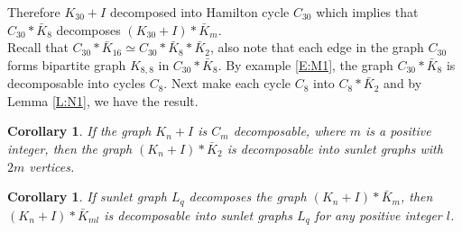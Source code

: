 \documentclass[12pt]{report}
\newtheorem{cor}[thm]{Corollary}
\begin{document}
Therefore $K_{30}+I$ decomposed into Hamilton cycle $C_{30}$ which
implies that $C_{30}*\bar{K}_8$ decomposes $(K_{30}+I)*\bar{K}_m$.\\
Recall that $C_{30}*\bar{K}_{16}\simeq C_{30}*\bar{K}_8*\bar{K}_2$,
also note that each edge in the graph $C_{30}$ forms %
bipartite graph $K_{8,8}$ in $C_{30}*\bar{K}_8$. By example
\ref{E:M1}, the graph $C_{30}*\bar{K}_8$ is decomposable into cycles
$C_8$. Next make each cycle $C_8$ into $C_8*\bar{K}_2$ and by Lemma
\ref{L:N1}, we have the result.
\begin{cor}
If the graph $K_n+I$ is $C_m$ decomposable, where $m$ is a positive
integer, then the graph $(K_n+I)*\bar{K}_2$ is decomposable into
sunlet graphs with $2m$ vertices.
\end{cor}
\begin{cor}
If sunlet graph $L_q$ decomposes the graph $(K_n+I)*\bar{K}_m$, then
$(K_n+I)*\bar{K}_{ml}$ is decomposable into sunlet graphs $L_q$ for
any positive integer $l$.
\end{cor}
\end{document}
